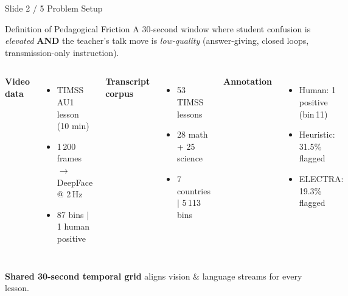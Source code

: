 \documentclass[aspectratio=169,10pt]{beamer}
\begin{document}
\begin{frame}{Slide 2 / 5 \quad Problem Setup}
\begin{block}{Definition of Pedagogical Friction}
A 30-second window where student confusion is \emph{elevated} \textbf{AND}
the teacher's talk move is \emph{low-quality} (answer-giving, closed loops,
transmission-only instruction).
\end{block}
\bigskip
\begin{columns}[T]
\textbf{\textcolor{myteal}{Video data}}
\begin{itemize}
  \item TIMSS AU1 lesson (10 min)
  \item 1\,200 frames $\to$ DeepFace @ 2\,Hz
  \item 87 bins $|$ 1 human positive
\end{itemize}
\textbf{\textcolor{myteal}{Transcript corpus}}
\begin{itemize}
  \item 53 TIMSS lessons
  \item 28 math + 25 science
  \item 7 countries $|$ 5\,113 bins
\end{itemize}
\textbf{\textcolor{myteal}{Annotation}}
\begin{itemize}
  \item Human: 1 positive (bin\,11)
  \item Heuristic: 31.5\% flagged
  \item ELECTRA: 19.3\% flagged
\end{itemize}
\end{columns}
\bigskip
\begin{alertblock}{}
\centering\textbf{Shared 30-second temporal grid} aligns vision \&
language streams for every lesson.
\end{alertblock}
\end{frame}
\end{document}

